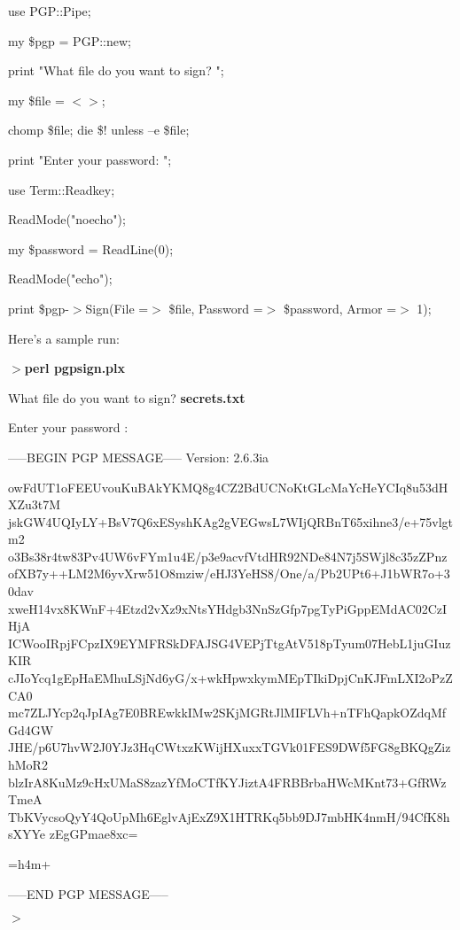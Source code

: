\documentclass[a4paper,11pt]{book}
\begin{document}
\noindent use PGP::Pipe;

\noindent 

\noindent my \$pgp = PGP::new;

\noindent print "What file do you want to sign? ";

\noindent my \$file = $<$$>$;

\noindent chomp \$file; die \$! unless --e \$file;

\noindent 

\noindent print "Enter your password: ";

\noindent use Term::Readkey;

\noindent ReadMode("noecho");

\noindent my \$password = ReadLine(0);

\noindent ReadMode("echo");

\noindent 

\noindent print \$pgp-$>$Sign(File =$>$ \$file, Password =$>$ \$password, Armor =$>$ 1);

\noindent 

\noindent 

\noindent Here's a sample run:

\noindent 

\noindent $>$\textbf{perl pgpsign.plx}

\noindent What file do you want to sign? \textbf{secrets.txt}

\noindent Enter your password : 

\noindent -----BEGIN PGP MESSAGE----- Version: 2.6.3ia

\noindent 

\noindent owFdUT1oFEEUvouKuBAkYKMQ8g4CZ2BdUCNoKtGLcMaYcHeYCIq8u53dHXZu3t7M jskGW4UQIyLY+BsV7Q6xESyshKAg2gVEGwsL7WIjQRBnT65xihne3/e+75vlgtm2 o3Bs38r4tw83Pv4UW6vFYm1u4E/p3e9acvfVtdHR92NDe84N7j5SWjl8c35zZPnz ofXB7y++LM2M6yvXrw51O8mziw/eHJ3YeHS8/One/a/Pb2UPt6+J1bWR7o+30dav xweH14vx8KWnF+4Etzd2vXz9xNtsYHdgb3NnSzGfp7pgTyPiGppEMdAC02CzIHjA ICWooIRpjFCpzIX9EYMFRSkDFAJSG4VEPjTtgAtV518pTyum07HebL1juGIuzKIR cJIoYcq1gEpHaEMhuLSjNd6yG/x+wkHpwxkymMEpTIkiDpjCnKJFmLXI2oPzZCA0 mc7ZLJYcp2qJpIAg7E0BREwkkIMw2SKjMGRtJlMIFLVh+nTFhQapkOZdqMfGd4GW JHE/p6U7hvW2J0YJz3HqCWtxzKWijHXuxxTGVk01FES9DWf5FG8gBKQgZizhMoR2 blzIrA8KuMz9cHxUMaS8zazYfMoCTfKYJiztA4FRBBrbaHWcMKnt73+GfRWzTmeA TbKVycsoQyY4QoUpMh6EglvAjExZ9X1HTRKq5bb9DJ7mbHK4nmH/94CfK8hsXYYe zEgGPmae8xc=

\noindent =h4m+

\noindent -----END PGP MESSAGE-----

\noindent $>$
\end{document}
